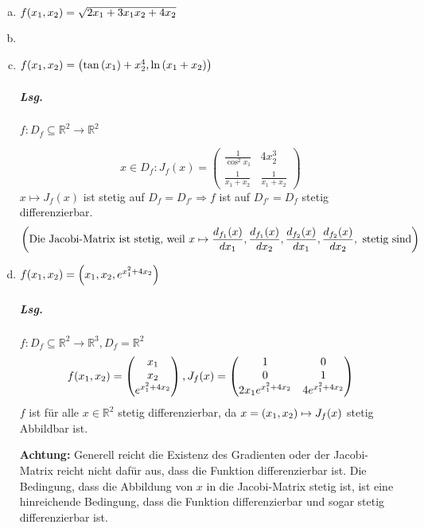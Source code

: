 \documentclass{scrreprt}
\begin{document}
\begin{enumerate}[a)]
\item $f\qty(x_1, x_2) = \sqrt{2x_1 + 3x_1x_2 + 4x_2}$
\item
\item $f\qty(x_1, x_2) = \qty(\tan\qty(x_1) + x_2^4, \ln\qty(x_1 + x_2))$
  \subparagraph{Lsg.} $f \colon D_f \subseteq \mathbb{R}^2 \to \mathbb{R}^2$
  \[
    x \in D_f \colon J_f (x) = \begin{pmatrix}
      \frac{1}{\cos^2 x_1} & 4 x_2^3 \\
      \frac{1}{x_1 + x_2} & \frac{1}{x_1 + x_2}
    \end{pmatrix}
  \]
  $x \mapsto J_f(x)$ ist stetig auf $D_f = D_{f'} \Rightarrow f$ ist auf
  $D_{f'} = D_f$ stetig differenzierbar.
  \[
    \qty(\text{Die Jacobi-Matrix ist stetig, weil }
     x \mapsto \frac{d_{f_1}(x)}{dx_1}, \frac{d_{f_1}(x)}{dx_2}, \frac{d_{f_2}(x)}{dx_1}, \frac{d_{f_2}(x)}{dx_2},
    \text{ stetig sind})
  \]

\item $f\qty(x_1, x_2) = \qty(x_1, x_2, e^{x_1^2 + 4 x_2})$
  \subparagraph{Lsg.} $f \colon D_f \subseteq \mathbb{R}^2 \to \mathbb{R}^3, D_f = \mathbb{R}^2$
  \[
    f\qty(x_1, x_2) = \begin{pmatrix}
      x_1 \\
      x_2 \\
      e^{x_1^2 + 4x_2}
    \end{pmatrix},
    J_f(x) = \begin{pmatrix}
      1 & 0 \\
      0 & 1 \\
      2 x_1 e^{x_1^2 + 4 x_2} & 4e^{x_1^2 + 4x_2}
    \end{pmatrix}
  \]
  $f$ ist für alle $x \in \mathbb{R}^2$ stetig differenzierbar, da
  $x = \qty(x_1, x_2) \mapsto J_f(x)$ stetig Abbildbar ist.

  \textbf{Achtung:} Generell reicht die Existenz des Gradienten oder der
  Jacobi-Matrix reicht nicht dafür aus, dass die Funktion differenzierbar ist.
  Die Bedingung, dass die Abbildung von $x$ in die Jacobi-Matrix stetig ist, ist
  eine hinreichende Bedingung, dass die Funktion differenzierbar und sogar stetig
  differenzierbar ist.
\end{enumerate}
\end{document}
